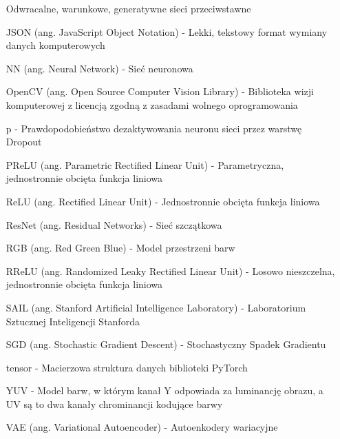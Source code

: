 \begin{itemize}
    Odwracalne, warunkowe, generatywne sieci przeciwstawne
    \item[JSON] (ang. JavaScript Object Notation) - Lekki, tekstowy format wymiany danych komputerowych
    \item[NN] (ang. Neural Network) - Sieć neuronowa
    \item[OpenCV] (ang. Open Source Computer Vision Library) - Biblioteka wizji komputerowej z licencją zgodną z zasadami wolnego oprogramowania
    \item[p] - Prawdopodobieństwo dezaktywowania neuronu sieci przez warstwę Dropout
    \item[PReLU] (ang. Parametric Rectified Linear Unit) - Parametryczna,
    jednostronnie obcięta funkcja liniowa
    \item[ReLU] (ang. Rectified Linear Unit) - Jednostronnie obcięta funkcja liniowa
    \item[ResNet] (ang. Residual Networks) - Sieć szczątkowa
    \item[RGB] (ang. Red Green Blue) - Model przestrzeni barw
    \item[RReLU] (ang. Randomized Leaky Rectified Linear Unit) - Losowo nieszczelna,
    jednostronnie obcięta funkcja liniowa
    \item[SAIL] (ang. Stanford Artificial Intelligence Laboratory) - Laboratorium Sztucznej Inteligencji Stanforda
    \item[SGD] (ang. Stochastic Gradient Descent) - Stochastyczny Spadek Gradientu
    \item[tensor] - Macierzowa struktura danych biblioteki PyTorch
    \item[YUV] - Model barw, w którym kanał Y odpowiada za luminancję obrazu, a UV
    są to dwa kanały chrominancji kodujące barwy
    \item[VAE] (ang. Variational Autoencoder) - Autoenkodery wariacyjne

  \end{itemize}
